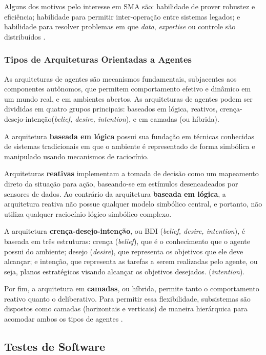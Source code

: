 Alguns dos motivos pelo interesse em SMA são: habilidade de prover robustez e eficiência; habilidade para permitir inter-operação entre sistemas legados; e habilidade para resolver problemas em que \textit{data}, \textit{expertise} ou controle são distribuídos \cite{jennings1998}.

    \subsubsection{Tipos de Arquiteturas Orientadas a Agentes}

As arquiteturas de agentes são mecanismos fundamentais, subjacentes aos componentes autônomos, que permitem comportamento efetivo e dinâmico em um mundo real, e em ambientes abertos. As arquiteturas de agentes podem ser divididas em quatro grupos principais: baseados em lógica, reativos, crença-desejo-intenção(\textit{belief, desire, intention}), e em camadas (ou híbrida)\cite{fabio2007}.

A arquitetura \textbf{baseada em lógica} possui sua fundação em técnicas conhecidas de sistemas tradicionais em que o ambiente é representado de forma simbólica e manipulado usando mecanismos de raciocínio\cite{fabio2007}.

Arquiteturas \textbf{reativas} implementam a tomada de decisão como um mapeamento direto da situação para ação, baseando-se em estímulos desencadeados por sensores de dados. Ao contrário da arquitetura \textbf{baseada em lógica}, a arquitetura reativa não possue qualquer modelo simbólico central, e portanto, não utiliza qualquer raciocínio lógico simbólico complexo\cite{fabio2007}.

A arquitetura \textbf{crença-desejo-intenção}, ou BDI (\textit{belief, desire, intention}), é baseada em três estruturas: crença (\textit{belief}), que é o conhecimento que o agente possui do ambiente; desejo (\textit{desire}), que representa os objetivos que ele deve alcançar; e intenção,  que representa as tarefas a serem realizadas pelo agente, ou seja, planos estratégicos visando alcançar os objetivos desejados. (\textit{intention})\cite{fabio2007}.

Por fim, a arquitetura em \textbf{camadas}, ou híbrida, permite tanto o comportamento reativo quanto o deliberativo. Para permitir essa flexibilidade, subsistemas são dispostos como camadas (horizontais e verticais) de maneira hierárquica para acomodar ambos os tipos de agentes \cite{fabio2007}.

  \subsection{Testes de Software}

